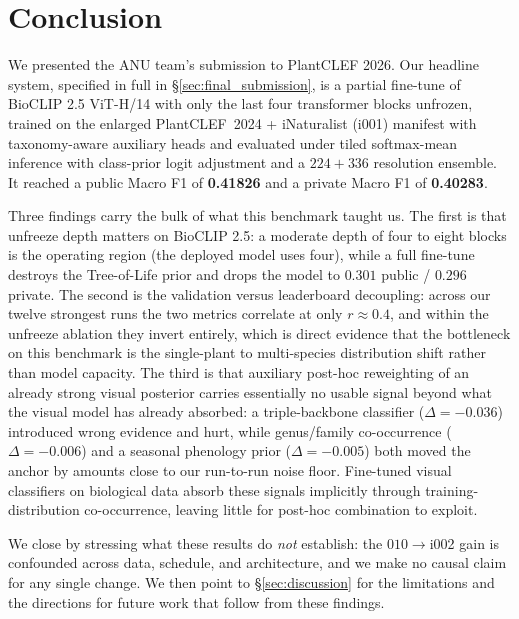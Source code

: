 \section{Conclusion}
\label{sec:conclusion}

We presented the ANU team's submission to PlantCLEF 2026. Our headline system, specified in full
in \S\ref{sec:final_submission}, is a partial fine-tune of BioCLIP 2.5 ViT-H/14 with only the last
four transformer blocks unfrozen, trained on the enlarged PlantCLEF~2024 + iNaturalist (i001) manifest
with taxonomy-aware auxiliary heads and evaluated under tiled softmax-mean inference with class-prior
logit adjustment and a $224{+}336$ resolution ensemble. It reached a public Macro F1 of
\textbf{0.41826} and a private Macro F1 of \textbf{0.40283}.

Three findings carry the bulk of what this benchmark taught us. The first is that unfreeze depth
matters on BioCLIP 2.5: a moderate depth of four to eight blocks is the operating region (the
deployed model uses four), while a full fine-tune destroys the Tree-of-Life prior and drops the
model to $0.301$ public / $0.296$ private. The second is
the validation versus leaderboard decoupling: across our twelve strongest runs the two metrics
correlate at only $r \approx 0.4$, and within the unfreeze ablation they invert entirely, which is
direct evidence that the bottleneck on this benchmark is the single-plant to multi-species
distribution shift rather than model capacity. The third is that auxiliary post-hoc reweighting of
an already strong visual posterior carries essentially no usable signal beyond what the visual
model has already absorbed: a triple-backbone classifier ($\Delta{=}{-}0.036$) introduced wrong
evidence and hurt, while genus/family co-occurrence ($\Delta{=}{-}0.006$) and a seasonal phenology
prior ($\Delta{=}{-}0.005$) both moved the anchor by amounts close to our run-to-run noise floor.
Fine-tuned visual classifiers on biological data absorb these signals implicitly through
training-distribution co-occurrence, leaving little for post-hoc combination to exploit.

We close by stressing what these results do \emph{not} establish: the $010\rightarrow$i002 gain is
confounded across data, schedule, and architecture, and we make no causal claim for any single
change. We then point to \S\ref{sec:discussion} for the limitations and the directions for future
work that follow from these findings.
